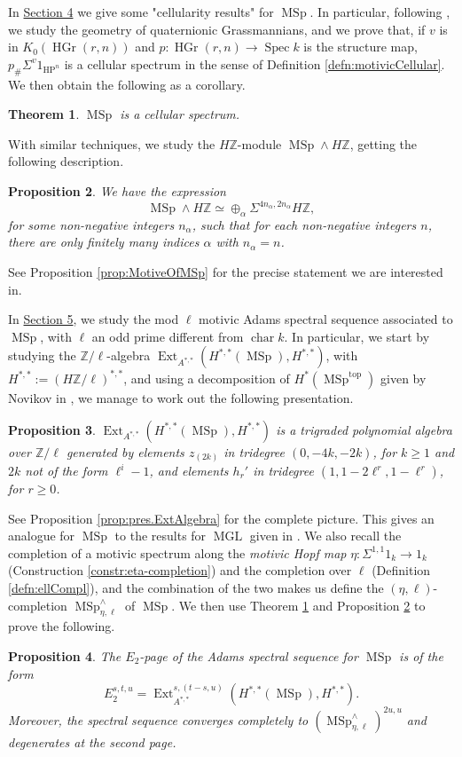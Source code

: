 \documentclass[10pt]{amsart}
\theoremstyle{definition}
\theoremstyle{plain}
\newtheorem{introthm}{Theorem}
\newtheorem{introprop}[introthm]{Proposition}
\numberwithin{equation}{section}
\newcommand{\0}{\emptyset}
\newcommand{\Z}{{\mathbb Z}}
\newcommand{\MGL}{{\operatorname{MGL}}}
\newcommand{\MSp}{{\operatorname{MSp}}}
\newcommand{\HGr}{{\operatorname{HGr}}}
\newcommand{\HP}{{\operatorname{HP}}}
\newcommand{\Spec}{{\operatorname{Spec}}}
\renewcommand{\top}{{\operatorname{top}}}
\newcommand{\Ext}{{\operatorname{Ext}}}
\newcommand{\chr}{{\operatorname{char}}}
\begin{document}
In \underline{Section 4} we give some "cellularity results" for $\MSp$. In particular, following \cite{panwal:grass}, we study the geometry of quaternionic Grassmannians, and we prove that, if $v$ is in $K_0(\HGr(r,n))$ and $p:\HGr(r,n) \to \Spec k$ is the structure map, $p_\#\Sigma^v1_{\HP^n}$ is a cellular spectrum in the sense of Definition \ref{defn:motivicCellular}. We then obtain the following as a corollary.
\begin{introthm}
\label{introthm:MSpCellular}
    $\MSp$ is a cellular spectrum.
\end{introthm}
With similar techniques, we study the $H\Z$-module $\MSp \wedge H\Z$, getting the following description.
\begin{introprop}
\label{introprop:MSpMotive}
We have the expression
     \begin{equation*}
        \MSp \wedge H\Z \simeq \oplus_\alpha \Sigma^{4n_\alpha,2n_\alpha}H\Z,
    \end{equation*}
    for some non-negative integers $n_\alpha$, such that for each non-negative integers $n$, there are only finitely many indices $\alpha$ with $n_\alpha=n$.
\end{introprop}
See Proposition \ref{prop:MotiveOfMSp} for the precise statement we are interested in.

In \underline{Section 5}, we study the mod $\ell$ motivic Adams spectral sequence associated to $\MSp$, with $\ell$ an odd prime different from $\chr k$. In particular, we start by studying the $\Z/\ell$-algebra $\Ext_{A^{*,*}}(H^{*,*}(\MSp), H^{*,*})$, with $H^{*,*} :=(H\Z/\ell)^{*,*}$, and using a decomposition of $H^*(\MSp^\top)$ given by Novikov in \cite{Thomcompl}, we manage to work out the following presentation.
\begin{introprop}
\label{introprop:ExtMSp}
    $\Ext_{A^{*,*}}(H^{*,*}(\MSp), H^{*,*})$ is a trigraded polynomial algebra over $\Z/\ell$ generated by elements $z_{(2k)}$ in tridegree $(0,-4k,-2k)$, for $k\ge 1$ and $2k$ not of the form $\ell^i-1$, and elements $h_r'$ in tridegree $(1,1-2\ell^r,1-\ell^r)$, for $r\ge 0$.
\end{introprop}
See Proposition \ref{prop:pres.ExtAlgebra} for the complete picture. This gives an analogue for $\MSp$ to the results for $\MGL$ given in \cite[Section 5]{lev:ellcoh}. We also recall the completion of a motivic spectrum along the \emph{motivic Hopf map} $\eta: \Sigma^{1,1}1_k \to 1_k$ (Construction \ref{constr:eta-completion}) and the completion over $\ell$ (Definition \ref{defn:ellCompl}), and the combination of the two makes us define the $(\eta,\ell)$-completion $\MSp_{\eta,\ell}^\wedge$ of $\MSp$. We then use Theorem \ref{introthm:MSpCellular} and Proposition \ref{introprop:MSpMotive} to prove the following.
\begin{introprop}
\label{introprop:ConvergeceA.S.S.}
    The $E_2$-page of the Adams spectral sequence for $\MSp$ is of the form
    $$E_2^{s,t,u}= \Ext_{A^{*,*}}^{s,(t-s,u)}(H^{*,*}(\MSp),H^{*,*}).$$
    Moreover, the spectral sequence converges completely to $(\MSp_{\eta,\ell}^\wedge)^{2u,u}$ and degenerates at the second page.
\end{introprop}
\end{document}
